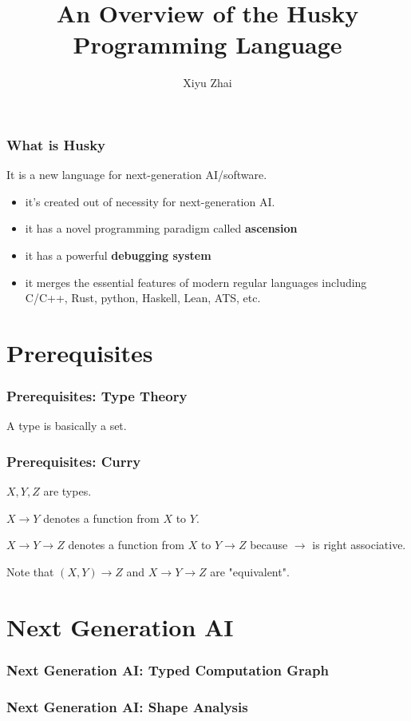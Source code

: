 \documentclass{beamer}   	%
\title{An Overview of the Husky Programming Language}
\author{Xiyu Zhai}
\date{}							%
\theoremstyle{definition}
\begin{document}
\maketitle


\begin{frame}
\frametitle{What is Husky}
It is a new language for next-generation AI/software.
\begin{itemize}
	\item it's created out of necessity for next-generation AI.
	\item it has a novel programming paradigm called \textbf{ascension}
	\item it has a powerful \textbf{debugging system}
	\item it merges the essential features of modern regular languages including C/C++, Rust, python, Haskell, Lean, ATS, etc.
\end{itemize}
\end{frame}

\section{Prerequisites}

\begin{frame}
\frametitle{Prerequisites: Type Theory}

A type is basically a set.
\end{frame}

\begin{frame}
\frametitle{Prerequisites: Curry}
	$X, Y, Z$ are types.

	$X \to Y$ denotes a function from $X$ to $Y$.

	$X \to Y \to Z$ denotes a function from $X$ to $Y\to Z$ because $\to$ is right associative.

	Note that $(X, Y)\to Z$ and $X \to Y \to Z$ are "equivalent".
\end{frame}

\section{Next Generation AI}

\begin{frame}
\frametitle{Next Generation AI: Typed Computation Graph}
\end{frame}

\begin{frame}
\frametitle{Next Generation AI: Shape Analysis}
\end{frame}
\end{document}
